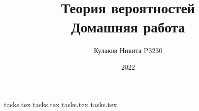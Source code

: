 
\title{Теория вероятностей\\ Домашняя работа}
\date{2022}
\author{Кулаков Никита P3230}



\maketitle

\begin{sloppypar}
\tableofcontents
\newpage
{tasks.tex}
{tasks.tex}
{tasks.tex}
{tasks.tex}
\end{sloppypar}

